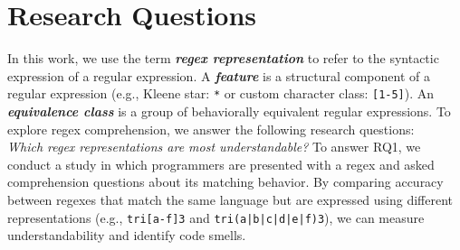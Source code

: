 \section{Research Questions}
\label{sec:study}
In this work, we use the term \textbf{\emph{regex representation}} to refer to the syntactic expression of a regular expression. A \textbf{\emph{feature}} is a structural component of a regular expression (e.g., Kleene star: \verb!*! or custom character class: \verb![1-5]!). An \textbf{\emph{equivalence class}} is a group of behaviorally equivalent regular expressions. 
To explore regex comprehension, we answer the following research questions: \\
%
%
 {\em Which regex representations are most understandable?}
To answer RQ1, we conduct a study in which programmers are presented with a regex and asked comprehension questions about its matching behavior. By comparing accuracy between  regexes that match the same language but are expressed using different representations (e.g., \verb!tri[a-f]3! and \verb!tri(a|b|c|d|e|f)3!), we can measure understandability and identify code smells.

